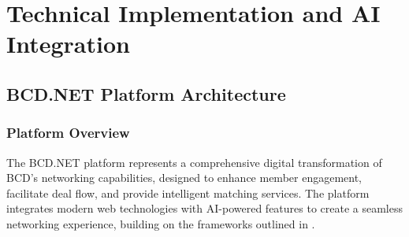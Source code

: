 \chapter{Technical Implementation and AI Integration}

\section{BCD.NET Platform Architecture}

\subsection{Platform Overview}
The BCD.NET platform represents a comprehensive digital transformation of BCD's networking capabilities, designed to enhance member engagement, facilitate deal flow, and provide intelligent matching services. The platform integrates modern web technologies with AI-powered features to create a seamless networking experience, building on the frameworks outlined in \citep{venugopal_containerized_microservices_architecture}.

